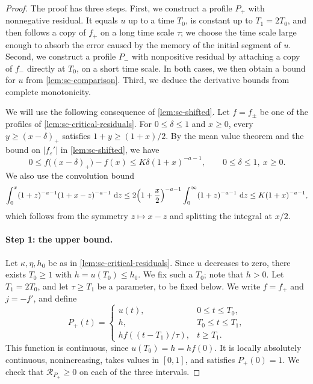 \begin{proof}
The proof has three steps. First, we construct a profile $P_+$ with nonnegative residual. It equals $u$ up to a time $T_0$, is constant up to $T_1=2T_0$, and then follows a copy of $f_+$ on a long time scale $\tau$; we choose the time scale large enough to absorb the error caused by the memory of the initial segment of $u$. Second, we construct a profile $P_-$ with nonpositive residual by attaching a copy of $f_-$ directly at $T_0$, on a short time scale. In both cases, we then obtain a bound for $u$ from \cref{lem:sc-comparison}. Third, we deduce the derivative bounds from complete monotonicity.

We will use the following consequence of \cref{lem:sc-shifted}. Let $f=f_{\pm}$ be one of the profiles of \cref{lem:sc-critical-residuals}. For $0\le\delta\le1$ and $x\ge0$, every $y\ge(x-\delta)_+$ satisfies $1+y\ge(1+x)/2$. By the mean value theorem and the bound on $|f_\varepsilon'|$ in \cref{lem:sc-shifted}, we have
\begin{equation}\label{eq:sc-shift-cost}
 0\le f\bigl((x-\delta)_+\bigr)-f(x)\le K\delta(1+x)^{-a-1},\qquad 0\le\delta\le1,\ x\ge0 .
\end{equation}
We also use the convolution bound
\begin{equation}\label{eq:sc-power-convolution}
 \int_0^x(1+z)^{-a-1}(1+x-z)^{-a-1}\,\mathop{}\!\mathrm d z\le2\Bigl(1+\frac x2\Bigr)^{-a-1}\int_0^\infty(1+z)^{-a-1}\,\mathop{}\!\mathrm d z\le K(1+x)^{-a-1},
\end{equation}
which follows from the symmetry $z\mapsto x-z$ and splitting the integral at $x/2$.

\paragraph{Step 1: the upper bound.} Let $\kappa,\eta,h_0$ be as in \cref{lem:sc-critical-residuals}. Since $u$ decreases to zero, there exists $T_0\ge1$ with $h=u(T_0)\le h_0$. We fix such a $T_0$; note that $h>0$. Let $T_1=2T_0$, and let $\tau\ge T_1$ be a parameter, to be fixed below. We write $f=f_+$ and $j=-f'$, and define
\[
 P_+(t)=
 \begin{cases}
 u(t),&0\le t\le T_0,\\
 h,&T_0\le t\le T_1,\\
 hf((t-T_1)/\tau),&t\ge T_1.
 \end{cases}
\]
This function is continuous, since $u(T_0)=h=hf(0)$. It is locally absolutely continuous, nonincreasing, takes values in $[0,1]$, and satisfies $P_+(0)=1$. We check that $\mathcal R_{P_+}\ge0$ on each of the three intervals.


\end{proof}
